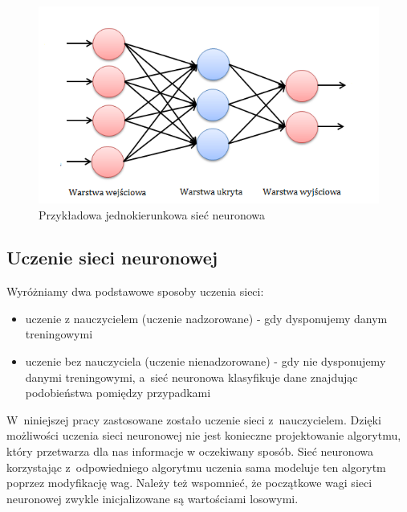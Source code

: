 \begin{figure}[ht!]
\centering
\includegraphics{res/exampleNet.png}
\caption[Caption for LOF]{Przykładowa jednokierunkowa sieć neuronowa\label{net}\footnotemark} 
\end{figure}

\subsection{Uczenie sieci neuronowej} 
Wyróżniamy dwa podstawowe sposoby uczenia sieci:
\begin{itemize}
\item uczenie z nauczycielem (uczenie nadzorowane) - gdy dysponujemy danym treningowymi
\item uczenie bez nauczyciela (uczenie nienadzorowane) - gdy nie dysponujemy danymi treningowymi, a~sieć neuronowa klasyfikuje dane znajdując podobieństwa pomiędzy przypadkami 
\end{itemize}
W~niniejszej pracy zastosowane zostało uczenie sieci z~nauczycielem. Dzięki możliwości uczenia sieci neuronowej nie jest konieczne projektowanie algorytmu, który przetwarza dla nas informacje w oczekiwany sposób. Sieć neuronowa korzystając z~odpowiedniego algorytmu uczenia sama modeluje ten algorytm poprzez modyfikację wag. Należy też wspomnieć, że początkowe wagi sieci neuronowej zwykle inicjalizowane są wartościami losowymi.   

